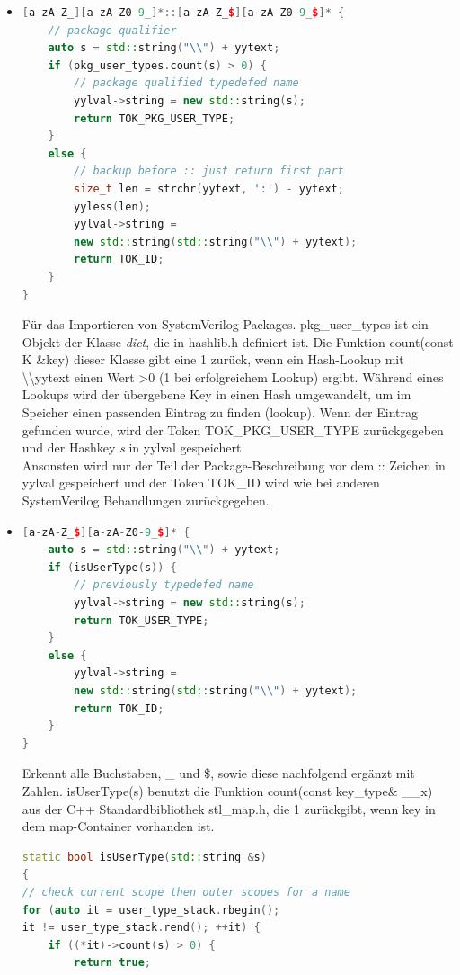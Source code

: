 \documentclass[11pt]{report}
\begin{document}
\begin{itemize}
\item
\begin{lstlisting}[language=C++]
[a-zA-Z_][a-zA-Z0-9_]*::[a-zA-Z_$][a-zA-Z0-9_$]* {
	// package qualifier
	auto s = std::string("\\") + yytext;
	if (pkg_user_types.count(s) > 0) {
		// package qualified typedefed name
		yylval->string = new std::string(s);
		return TOK_PKG_USER_TYPE;
	}
	else {
		// backup before :: just return first part
		size_t len = strchr(yytext, ':') - yytext;
		yyless(len);
		yylval->string = 
		new std::string(std::string("\\") + yytext);
		return TOK_ID;
	}
}
\end{lstlisting}
Für das Importieren von SystemVerilog Packages. pkg\_user\_types ist ein Objekt der Klasse \textit{dict}, die in hashlib.h definiert ist. Die Funktion count(const K \&key) dieser Klasse gibt eine 1 zurück, wenn ein Hash-Lookup mit \textbackslash\textbackslash yytext einen Wert \textgreater 0 (1 bei erfolgreichem Lookup) ergibt. Während eines Lookups wird der übergebene Key in einen Hash umgewandelt, um im Speicher einen passenden Eintrag zu finden (lookup). Wenn der Eintrag gefunden wurde, wird der Token TOK\_PKG\_USER\_TYPE zurückgegeben und der Hashkey \textit{s} in yylval gespeichert.\\
Ansonsten wird nur der Teil der Package-Beschreibung vor dem :: Zeichen in yylval gespeichert und der Token TOK\_ID wird wie bei anderen SystemVerilog Behandlungen zurückgegeben.
\item
\begin{lstlisting}[language=C++]
[a-zA-Z_$][a-zA-Z0-9_$]* {
	auto s = std::string("\\") + yytext;
	if (isUserType(s)) {
		// previously typedefed name
		yylval->string = new std::string(s);
		return TOK_USER_TYPE;
	}
	else {
		yylval->string = 
		new std::string(std::string("\\") + yytext);
		return TOK_ID;
	}
}
\end{lstlisting}
Erkennt alle Buchstaben, \_ und \$, sowie diese nachfolgend ergänzt mit Zahlen.
isUserType(s) benutzt die Funktion count(const key\_type\& \_\_x) aus der C++ Standardbibliothek stl\_map.h, die 1 zurückgibt, wenn key in dem map-Container vorhanden ist. 
\begin{lstlisting}[language=C++]
static bool isUserType(std::string &s)
{
// check current scope then outer scopes for a name
for (auto it = user_type_stack.rbegin(); 
it != user_type_stack.rend(); ++it) {
	if ((*it)->count(s) > 0) {
		return true;

\end{lstlisting}
\end{itemize}
\end{document}
